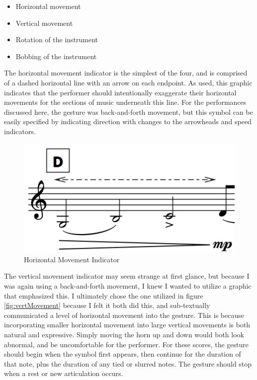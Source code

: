 \begin{itemize}
    \item Horizontal movement
    \item Vertical movement
    \item Rotation of the instrument
    \item Bobbing of the instrument
\end{itemize}

The horizontal movement indicator is the simplest of the four, and is comprised of a dashed horizontal line with an arrow on each endpoint. As used, this graphic indicates that the performer should intentionally exaggerate their horizontal movements for the sections of music underneath this line. For the performances discussed here, the gesture was back-and-forth movement, but this symbol can be easily specified by indicating direction with changes to the arrowheads and speed indicators.

\begin{figure}
    \centering
    \includegraphics{Scores/horizontal.png}
    \caption{Horizontal Movement Indicator}
    \label{fig:horMovement}
\end{figure}

The vertical movement indicator may seem strange at first glance, but because I was again using a back-and-forth movement, I knew I wanted to utilize a graphic that emphasized this. I ultimately chose the one utilized in figure \ref{fig:vertMovement} because I felt it both did this, and sub-textually communicated a level of horizontal movement into the gesture. This is because incorporating smaller horizontal movement into large vertical movements is both natural and expressive. Simply moving the horn up and down would both look abnormal, and be uncomfortable for the performer. For these scores, the gesture should begin when the symbol first appears, then continue for the duration of that note, plus the duration of any tied or slurred notes. The gesture should stop when a rest or new articulation occurs.


